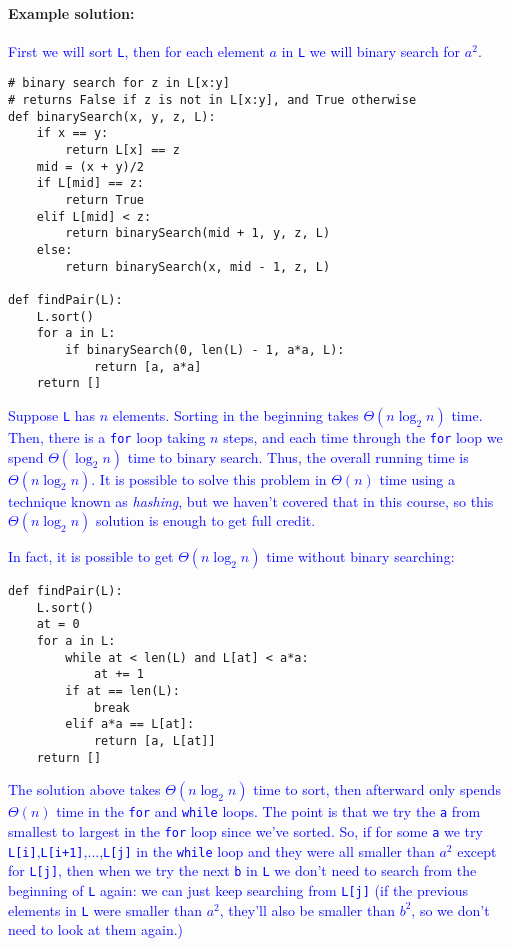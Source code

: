 \documentclass[11pt]{article}
\newcommand{\sol}[1]{\textcolor{blue}{#1}}
\begin{document}
\paragraph{Example solution:}
\sol{First we will sort \texttt{L}, then for each element $a$ in
  \texttt{L} we will binary search for $a^2$.}

\begin{verbatim}
# binary search for z in L[x:y]
# returns False if z is not in L[x:y], and True otherwise
def binarySearch(x, y, z, L):
    if x == y:
        return L[x] == z
    mid = (x + y)/2
    if L[mid] == z:
        return True
    elif L[mid] < z:
        return binarySearch(mid + 1, y, z, L)
    else:
        return binarySearch(x, mid - 1, z, L)

def findPair(L):
    L.sort()
    for a in L:
        if binarySearch(0, len(L) - 1, a*a, L):
            return [a, a*a]
    return []
\end{verbatim}
 
\sol{Suppose \texttt{L} has $n$ elements.  Sorting in the beginning
  takes $\Theta(n\log_2 n)$ time.  Then, there is a \texttt{for} loop
  taking $n$ steps, and each time through the \texttt{for} loop we
  spend $\Theta(\log_2 n)$ time to binary search.  Thus, the overall
  running time is $\Theta(n\log_2 n)$.  It is possible to solve this
  problem in $\Theta(n)$ time using a technique known as  {\em
     hashing}, but we haven't covered that in this course, so this
   $\Theta(n\log_2 n)$ solution is enough to get full credit.}

\sol{In fact, it is possible to get $\Theta(n\log_2 n)$ time without
  binary searching:}

\newpage

\begin{verbatim}
def findPair(L):
    L.sort()
    at = 0
    for a in L:
        while at < len(L) and L[at] < a*a:
            at += 1
        if at == len(L):
            break
        elif a*a == L[at]:
            return [a, L[at]]
    return []
\end{verbatim}

\sol{The solution above takes $\Theta(n\log_2 n)$ time to sort, then
  afterward only spends $\Theta(n)$ time in the \texttt{for} and
  \texttt{while} loops.  The point is that we try the \texttt{a} from
  smallest to largest in the \texttt{for} loop since we've sorted.
  So, if for some \texttt{a} we try
  \texttt{L[i]},\texttt{L[i+1]},$\ldots$,\texttt{L[j]} in the
  \texttt{while} loop and they were
  all smaller than $a^2$ except for \texttt{L[j]}, then when we try
  the next \texttt{b} in \texttt{L} we don't need to search from the
  beginning of \texttt{L} again: we can just keep searching from
  \texttt{L[j]} (if the
  previous elements in \texttt{L} were smaller than $a^2$, they'll
  also be smaller than $b^2$, so we don't need to look at them again.)}
\end{document}
